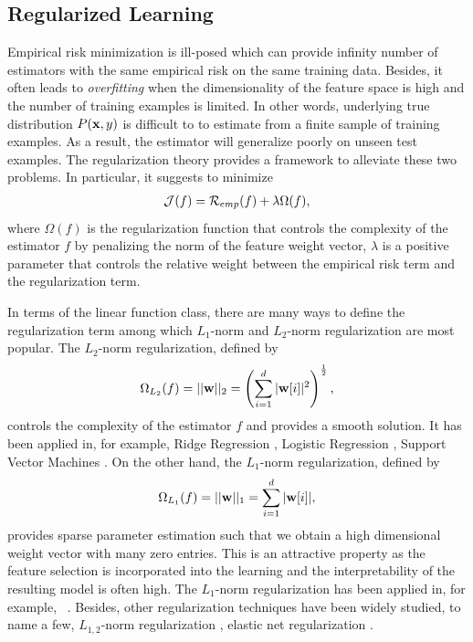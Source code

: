 \subsection{Regularized Learning}\label{sc_rl}

Empirical risk minimization is ill-posed which can provide infinity number of estimators with the same empirical risk on the same training data.
Besides, it often leads to \textit{overfitting} when the dimensionality of the feature space is high and the number of training examples is limited.
In other words, underlying true distribution $P(\mathbf {x},y)$ is difficult to to estimate from a finite sample of training examples.
As a result, the estimator will generalize poorly on unseen test examples.
The {regularization theory} \citep{Evgeniou99a,Evgeniou02regularization} provides a framework to alleviate these two problems.
In particular, it suggests to minimize 
 \begin{align}
	\mathcal{J}(f) = \mathcal{R}_{emp}(f) + \lambda\Omega(f), \label{rl}
\end{align}
where $\Omega(f)$ is the regularization function that controls the complexity of the estimator $f$ by penalizing the norm of the feature weight vector, $\lambda$ is a positive parameter that controls the relative weight between the empirical risk term and the regularization term.

In terms of the linear function class, there are many ways to define the regularization term among which $L_1$-norm and $L_2$-norm regularization are most popular.
The $L_2$-norm regularization, defined by 
\begin{align}
	\Omega_{L_2}(f) = ||\mathbf {w}||_2=\left(\sum_{i=1}^d|\mathbf {w}[i]|^2\right)^{\frac{1}{2}}, \label{l2_norm}
\end{align} 
controls the complexity of the estimator $f$ and provides a smooth solution.
It has been applied in, for example, Ridge Regression \citep{Hoerl00ridge}, Logistic Regression \citep{Chen00}, Support Vector Machines \citep{Cortes95support}.
On the other hand, the $L_1$-norm regularization, defined by
\begin{align*}
	\Omega_{L_1}(f) = ||\mathbf {w}||_1=\sum_{i=1}^d|\mathbf {w}[i]|,
\end{align*}
provides sparse parameter estimation such that we obtain a high dimensional weight vector with many zero entries.
This is an attractive property as the feature selection is incorporated into the learning and the interpretability of the resulting model is often high.
The $L_1$-norm regularization has been applied in, for example, \lasso\ \citep{Tibshirani94regression}.
Besides, other regularization techniques have been widely studied, to name a few, $L_{1,2}$-norm regularization \citep{Argyriou07multitask}, elastic net regularization \citep{Zou05regularizationa}.


